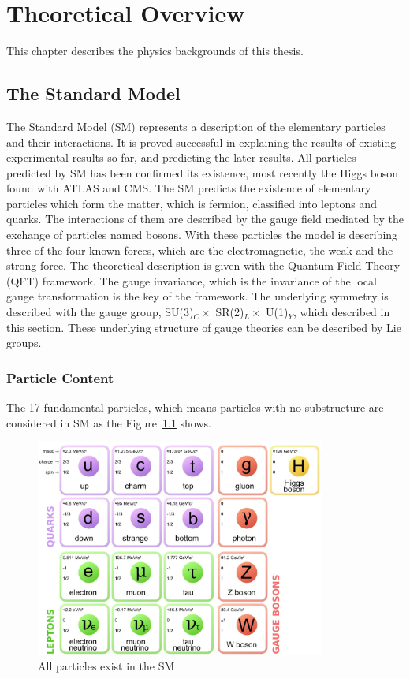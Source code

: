 \chapter{Theoretical Overview}
\label{chap:theory}
This chapter describes the physics backgrounds of this thesis.

\section{The Standard Model}
\label{sec:SM}

The Standard Model (SM) represents a description of the elementary particles and their interactions.
It is proved successful in explaining the results of existing experimental results so far, and predicting the later results.
All particles predicted by SM has been confirmed its existence, most recently the Higgs boson found with ATLAS and CMS.
The SM predicts the existence of elementary particles which form the matter, which is fermion, classified into leptons and quarks.
The interactions of them are described by the gauge field mediated by the exchange of particles named bosons.
With these particles the model is describing three of the four known forces, which are the electromagnetic, the weak and the strong force. 
The theoretical description is given with the Quantum Field Theory (QFT) framework. The gauge invariance, which is the invariance of the local gauge transformation is the key of the framework. The underlying symmetry is described with the gauge group, SU(3)$_C \times$ SR(2)$_L \times$ U(1)$_Y$, which described in this section. These underlying structure of gauge theories can be described by Lie groups.

\subsection{Particle Content}
The 17 fundamental particles, which means particles with no substructure are considered in SM as the Figure~\ref{fig:SM} shows.
\begin{figure}[tbp]
\begin{center}
 \includegraphics[width=0.85\textwidth,keepaspectratio]{figures/SM}
\caption{
All particles exist in the SM %
}
\label{fig:SM}
\end{center}
\end{figure}

